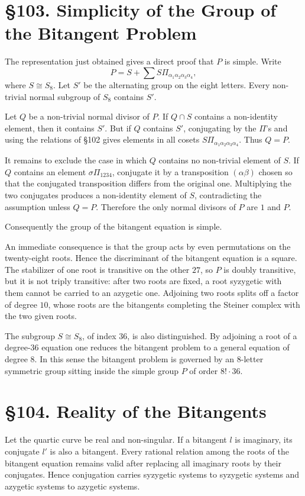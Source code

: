 \documentclass[11pt,a4paper]{book}
\newcommand{\webersection}[2]{\clearpage\section*{\S #1. #2}}
\begin{document}
\webersection{103}{Simplicity of the Group of the Bitangent Problem}

The representation just obtained gives a direct proof that \(P\) is simple.  Write
\[
P=S+\sum S\Pi_{\alpha_1\alpha_2\alpha_3\alpha_4},
\]
where \(S\cong S_8\).  Let \(S'\) be the alternating group on the eight letters.  Every non-trivial normal subgroup of \(S_8\) contains \(S'\).

Let \(Q\) be a non-trivial normal divisor of \(P\).  If \(Q\cap S\) contains a non-identity element, then it contains \(S'\).  But if \(Q\) contains \(S'\), conjugating by the \(\Pi\)'s and using the relations of §102 gives elements in all cosets \(S\Pi_{\alpha_1\alpha_2\alpha_3\alpha_4}\).  Thus \(Q=P\).

It remains to exclude the case in which \(Q\) contains no non-trivial element of \(S\).  If \(Q\) contains an element \(\sigma\Pi_{1234}\), conjugate it by a transposition \((\alpha\beta)\) chosen so that the conjugated transposition differs from the original one.  Multiplying the two conjugates produces a non-identity element of \(S\), contradicting the assumption unless \(Q=P\).  Therefore the only normal divisors of \(P\) are \(1\) and \(P\).

Consequently the group of the bitangent equation is simple.

An immediate consequence is that the group acts by even permutations on the twenty-eight roots.  Hence the discriminant of the bitangent equation is a square.  The stabilizer of one root is transitive on the other \(27\), so \(P\) is doubly transitive, but it is not triply transitive: after two roots are fixed, a root syzygetic with them cannot be carried to an azygetic one.  Adjoining two roots splits off a factor of degree \(10\), whose roots are the bitangents completing the Steiner complex with the two given roots.

The subgroup \(S\cong S_8\), of index \(36\), is also distinguished.  By adjoining a root of a degree-\(36\) equation one reduces the bitangent problem to a general equation of degree \(8\).  In this sense the bitangent problem is governed by an \(8\)-letter symmetric group sitting inside the simple group \(P\) of order \(8!\cdot36\).


\webersection{104}{Reality of the Bitangents}

Let the quartic curve be real and non-singular.  If a bitangent \(l\) is imaginary, its conjugate \(l'\) is also a bitangent.  Every rational relation among the roots of the bitangent equation remains valid after replacing all imaginary roots by their conjugates.  Hence conjugation carries syzygetic systems to syzygetic systems and azygetic systems to azygetic systems.
\end{document}
